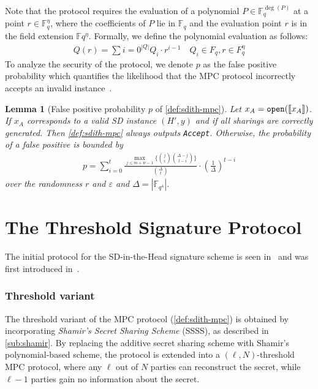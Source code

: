 \documentclass[11pt]{report}
\theoremstyle{definition}
\theoremstyle{plain}
\newtheorem{lemma}{Lemma}[section]
\begin{document}
Note that the protocol requires the evaluation of a polynomial $P \in \mathbb{F}_q^{\deg(P)}$ at a point $r \in \mathbb{F}_q^\eta$, where the coefficients of $P$ lie in $\mathbb{F}_q$ and the evaluation point $r$ is in the field extension $\mathbb{F}q^\eta$. Formally, we define the polynomial evaluation as follows:
\begin{align}
  Q(r)  = \textstyle\sum{i=0}^{|Q|} Q_i \cdot r^{i-1}  \quad Q_i \in F_q, r \in F_q^\eta\label{eq:sdith_mpc_polynomial_eval}
\end{align}
To analyze the security of the protocol, we denote $p$ as the false positive probability which quantifies the likelihood that the MPC protocol incorrectly accepts an invalid instance~\cite{feneuil2022syndrome,aguilarsyndrome11}.

\begin{lemma}[False positive probability $p$ of \autoref{def:sdith-mpc}]\label{lem:sdith-mpc-soundness}
  Let $x_A = \texttt{open}(\llbracket x_A \rrbracket)$. If $x_A$ corresponds to a valid SD instance $(H', y)$ and if all sharings are correctly generated. Then \autoref{def:sdith-mpc} always outputs \texttt{Accept}.
  Otherwise, the probability of a false positive is bounded by
  \begin{align*}
    p = \sum_{i=0}^t \frac{\max_{j \leq m + w -1} \{ \binom{j}{i} \binom{\Delta - j}{t-i} \}}{\binom{\Delta}{t}} \cdot \left(\frac{1}{\Delta}\right)^{t-i}
  \end{align*} over the randomness $r$ and $\varepsilon$ and $\Delta = |\mathbb{F}_{q^4}|$.
\end{lemma}

\section{The Threshold Signature Protocol}\label{sec:sdith-signature}

The initial protocol for the SD-in-the-Head signature scheme is seen in~\cite[Figure 1]{aguilarsyndrome11} and was first introduced in~\cite[Figure 1, p19]{feneuil2022syndrome}.

\subsubsection{Threshold variant}\label{sub:sdith-threshold-sss}

The threshold variant of the MPC protocol (\autoref{def:sdith-mpc}) is obtained by incorporating \textit{Shamir's Secret Sharing Scheme} (SSSS), as described in \autoref{sub:shamir}. By replacing the additive secret sharing scheme with Shamir's polynomial-based scheme, the protocol is extended into a $(\ell, N)$-threshold MPC protocol, where any $\ell$ out of $N$ parties can reconstruct the secret, while $\ell-1$ parties gain no information about the secret.
\end{document}
